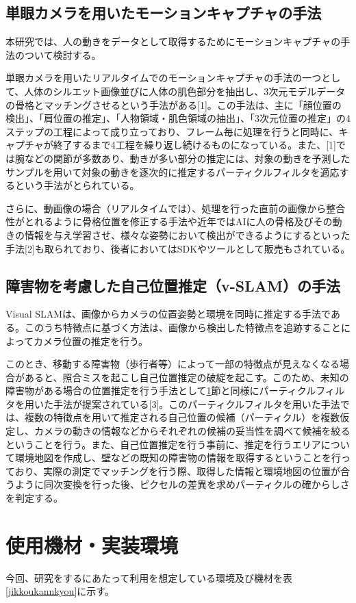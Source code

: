 \documentclass[11pt]{jreport}
\begin{document}
\section{単眼カメラを用いたモーションキャプチャの手法}\label{rep1}
本研究では、人の動きをデータとして取得するためにモーションキャプチャの手法のついて検討する。

単眼カメラを用いたリアルタイムでのモーションキャプチャの手法の一つとして、人体のシルエット画像並びに人体の肌色部分を抽出し、3次元モデルデータの骨格とマッチングさせるという手法がある[1]。この手法は、主に「顔位置の検出」、「肩位置の推定」、「人物領域・肌色領域の抽出」、「3次元位置の推定」の4ステップの工程によって成り立っており、フレーム毎に処理を行うと同時に、キャプチャが終了するまで4工程を繰り返し続けるものになっている。また、[1]では腕などの関節が多数あり、動きが多い部分の推定には、対象の動きを予測したサンプルを用いて対象の動きを逐次的に推定するパーティクルフィルタを適応するという手法がとられている。

さらに、動画像の場合（リアルタイムでは）、処理を行った直前の画像から整合性がとれるように骨格位置を修正する手法や近年ではAIに人の骨格及びその動きの情報を与え学習させ、様々な姿勢において検出ができるようにするといった手法[2]も取られており、後者においてはSDKやツールとして販売もされている。

\section{障害物を考慮した自己位置推定（v-SLAM）の手法}
Visual SLAMは、画像からカメラの位置姿勢と環境を同時に推定する手法である。このうち特徴点に基づく方法は、画像から検出した特徴点を追跡することによってカメラ位置の推定を行う。

このとき、移動する障害物（歩行者等）によって一部の特徴点が見えなくなる場合があると、照合ミスを起こし自己位置推定の破綻を起こす。このため、未知の障害物がある場合の位置推定を行う手法として\ref{rep1}節と同様にパーティクルフィルタを用いた手法が提案されている[3]。このパーティクルフィルタを用いた手法では、複数の特徴点を用いて推定される自己位置の候補（パーティクル）を複数仮定し、カメラの動きの情報などからそれぞれの候補の妥当性を調べて候補を絞るということを行う。また、自己位置推定を行う事前に、推定を行うエリアについて環境地図を作成し、壁などの既知の障害物の情報を取得するということを行っており、実際の測定でマッチングを行う際、取得した情報と環境地図の位置が合うように同次変換を行った後、ピクセルの差異を求めパーティクルの確からしさを判定する。

\chapter{使用機材・実装環境}
今回、研究をするにあたって利用を想定している環境及び機材を表\ref{jikkoukannkyou}に示す。
\end{document}
